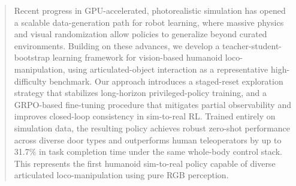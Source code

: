 \begin{abstract}


Recent progress in GPU-accelerated, photorealistic simulation has opened a scalable data-generation path for robot learning, where massive physics and visual randomization allow policies to generalize beyond curated environments. Building on these advances, we develop a teacher-student-bootstrap learning framework for vision-based humanoid loco-manipulation, using articulated-object interaction as a representative high-difficulty benchmark. Our approach introduces a staged-reset exploration strategy that stabilizes long-horizon privileged-policy training, and a GRPO-based fine-tuning procedure that mitigates partial observability and improves closed-loop consistency in sim-to-real RL. Trained entirely on simulation data, the resulting policy achieves robust zero-shot performance across diverse door types and outperforms human teleoperators by up to 31.7\% in task completion time under the same whole-body control stack. This represents the first humanoid sim-to-real policy capable of diverse articulated loco-manipulation using pure RGB perception.

\end{abstract}